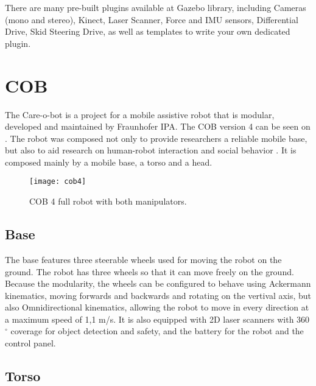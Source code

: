 There are many pre-built plugins available at Gazebo library, including Cameras (mono and stereo), Kinect, Laser Scanner, Force and IMU sensors, Differential Drive, Skid Steering Drive, as well as templates to write your own dedicated plugin.



\section{COB}

The Care-o-bot is a project for a mobile assistive robot that is modular, developed and maintained by Fraunhofer IPA. The COB version 4 can be seen on . The robot was composed not only to provide researchers a reliable mobile base, but also to aid research on human-robot interaction and social behavior \cite{mci/Kittmann2015}. It is composed mainly by a mobile base, a torso and a head.

\begin{figure}[!ht]
\centering
\texttt{[image: cob4]}
\caption{COB 4 full robot with both manipulators.}
\label{fig:cob4}
\end{figure}

\subsection{Base}

The base features three steerable wheels used for moving the robot on the ground. The robot has three wheels so that it can move freely on the ground. Because the modularity, the wheels can be configured to behave using Ackermann kinematics, moving forwards and backwards and rotating on the vertival axis, but also Omnidirectional kinematics, allowing the robot to move in every direction at a maximum speed of 1,1 m/s. It is also equipped with 2D laser scanners with 360$^{\circ}$ coverage for object detection and safety, and the battery for the robot and the control panel.

\subsection{Torso}

